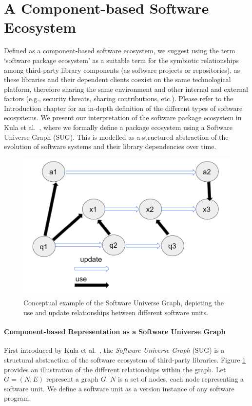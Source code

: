 \section{A Component-based Software Ecosystem}

Defined as a component-based software ecosystem, we suggest using the term `software package ecosystem' as a suitable term for the symbiotic relationships among third-party library components (as software projects or repositories), as these libraries and their dependent clients coexist on the same technological platform, therefore sharing the same environment and other internal and external factors (e.g., security threats, sharing contributions, etc.).
Please refer to the Introduction chapter for an in-depth definition of the different types of software ecosystems.
We present our interpretation of the software package ecosystem in Kula et al.~\cite{KulaSANER18}, where we formally define a package ecosystem using a Software Universe Graph (SUG).
This is modelled as a structured abstraction of the evolution of software systems and their library dependencies over time.

\begin{figure}
	\centering
	\includegraphics[width=.7\textwidth]{book/chapter-promisesandperils/pics/UniversalExample.jpg}
	\caption{Conceptual example of the Software Universe Graph, depicting the use and update relationships between different software units.}
	\label{fig:SUG}
\end{figure}


\paragraph{\textbf{Component-based Representation as a Software Universe Graph}}
\label{PPM:sec:SUG}

First introduced by Kula et al.~\cite{KulaSANER18}, the \textit{Software Universe Graph} (SUG) is a structural abstraction of the software ecosystem of third-party libraries.
Figure \ref{fig:SUG} provides an illustration of the different relationships within the graph.
Let $G= (N,E)$ represent a graph $G$. $N$ is a set of nodes, each node representing a software unit. 
We define a software unit as a version instance of any software program. 

